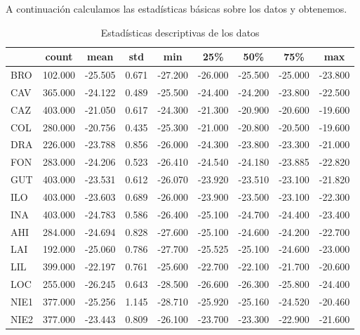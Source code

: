 \documentclass[a4paper,11pt]{article}
\begin{document}
A continuación calculamos las estadísticas básicas sobre los datos y obtenemos.

\begin{table}[ht]
    \centering
    \caption{Estadísticas descriptivas de los datos}
    \label{tab:estadisticas_basicas}
    \begin{tabular}{|l|c|c|c|c|c|c|c|c|}
        \hline
        & count & mean & std & min & 25\% & 50\% & 75\% & max \\
        \hline
        BRO & 102.000 & -25.505 & 0.671 & -27.200 & -26.000 & -25.500 & -25.000 & -23.800 \\
        CAV  & 365.000 & -24.122 & 0.489 & -25.500 & -24.400 & -24.200 & -23.800 & -22.500 \\
        CAZ  & 403.000 & -21.050 & 0.617 & -24.300 & -21.300 & -20.900 & -20.600 & -19.600 \\
        COL    & 280.000 & -20.756 & 0.435 & -25.300 & -21.000 & -20.800 & -20.500 & -19.600 \\
        DRA  & 226.000 & -23.788 & 0.856 & -26.000 & -24.300 & -23.800 & -23.300 & -21.000 \\
        FON  & 283.000 & -24.206 & 0.523 & -26.410 & -24.540 & -24.180 & -23.885 & -22.820 \\
        GUT  & 403.000 & -23.531 & 0.612 & -26.070 & -23.920 & -23.510 & -23.100 & -21.820 \\
        ILO & 403.000 & -23.603 & 0.689 & -26.000 & -23.900 & -23.500 & -23.100 & -22.300 \\
        INA  & 403.000 & -24.783 & 0.586 & -26.400 & -25.100 & -24.700 & -24.400 & -23.400 \\
        AHI & 284.000 & -24.694 & 0.828 & -27.600 & -25.100 & -24.600 & -24.200 & -22.700 \\
        LAI  & 192.000 & -25.060 & 0.786 & -27.700 & -25.525 & -25.100 & -24.600 & -23.000 \\
        LIL & 399.000 & -22.197 & 0.761 & -25.600 & -22.700 & -22.100 & -21.700 & -20.600 \\
        LOC  & 255.000 & -26.245 & 0.643 & -28.500 & -26.600 & -26.300 & -25.800 & -24.400 \\
        NIE1 & 377.000 & -25.256 & 1.145 & -28.710 & -25.920 & -25.160 & -24.520 & -20.460 \\
        NIE2 & 377.000 & -23.443 & 0.809 & -26.100 & -23.700 & -23.300 & -22.900 & -21.600 \\

\end{tabular}
\end{table}
\end{document}
